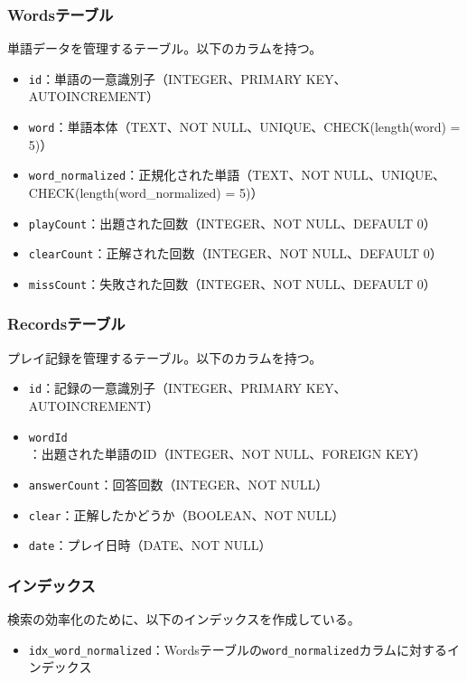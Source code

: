 \documentclass[a4j]{ujarticle}
\begin{document}
\subsubsection{Wordsテーブル}
単語データを管理するテーブル。以下のカラムを持つ。
\begin{itemize}
  \item \texttt{id}：単語の一意識別子（INTEGER、PRIMARY KEY、AUTOINCREMENT）
  \item \texttt{word}：単語本体（TEXT、NOT NULL、UNIQUE、CHECK(length(word) = 5)）
  \item \texttt{word\_normalized}：正規化された単語（TEXT、NOT NULL、UNIQUE、CHECK(length(word\_normalized) = 5)）
  \item \texttt{playCount}：出題された回数（INTEGER、NOT NULL、DEFAULT 0）
  \item \texttt{clearCount}：正解された回数（INTEGER、NOT NULL、DEFAULT 0）
  \item \texttt{missCount}：失敗された回数（INTEGER、NOT NULL、DEFAULT 0）
\end{itemize}

\subsubsection{Recordsテーブル}
プレイ記録を管理するテーブル。以下のカラムを持つ。
\begin{itemize}
  \item \texttt{id}：記録の一意識別子（INTEGER、PRIMARY KEY、AUTOINCREMENT）
  \item \texttt{wordId}：出題された単語のID（INTEGER、NOT NULL、FOREIGN KEY）
  \item \texttt{answerCount}：回答回数（INTEGER、NOT NULL）
  \item \texttt{clear}：正解したかどうか（BOOLEAN、NOT NULL）
  \item \texttt{date}：プレイ日時（DATE、NOT NULL）
\end{itemize}

\subsubsection{インデックス}
検索の効率化のために、以下のインデックスを作成している。
\begin{itemize}
  \item \texttt{idx\_word\_normalized}：Wordsテーブルの\texttt{word\_normalized}カラムに対するインデックス
\end{itemize}
\end{document}
